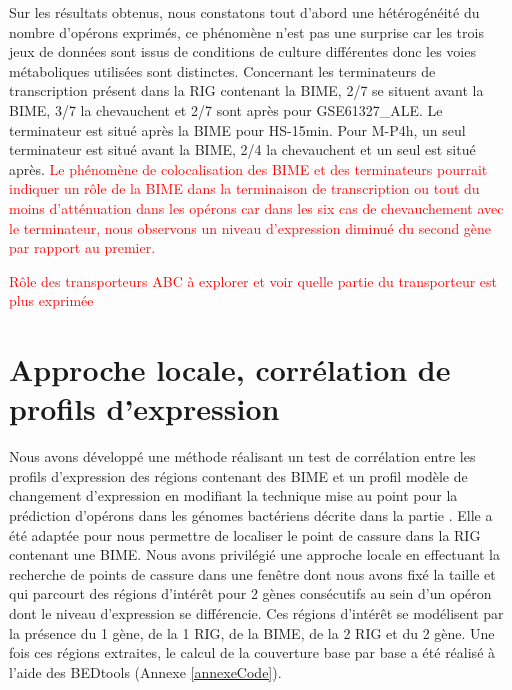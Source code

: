 \documentclass[12pt,a4paper]{report}
\begin{document}
\begin{onehalfspace}
Sur les résultats obtenus, nous constatons tout d'abord une hétérogénéité du nombre d'opérons exprimés, ce phénomène n'est pas une surprise car les trois jeux de données sont issus de conditions de culture différentes donc les voies métaboliques utilisées sont distinctes. Concernant les terminateurs de transcription présent dans la RIG contenant la BIME, 2/7 se situent avant la BIME, 3/7 la chevauchent et 2/7 sont après pour GSE61327\_ALE. Le terminateur est situé après la BIME pour HS-15min. Pour M-P4h, un seul terminateur est situé avant la BIME, 2/4 la chevauchent et un seul est situé après. \textcolor{red}{Le phénomène de colocalisation des BIME et des terminateurs pourrait indiquer un rôle de la BIME dans la terminaison de transcription ou tout du moins d'atténuation dans les opérons car dans les six cas de chevauchement avec le terminateur, nous observons un niveau d'expression diminué du second gène par rapport au premier.}

\textcolor{red}{Rôle des transporteurs ABC à explorer et voir quelle partie du transporteur est plus exprimée}

\section*{Approche locale, corrélation de profils d'expression}
\label{approche_locale}
Nous avons développé une méthode réalisant un test de corrélation entre les profils d'expression des régions contenant des BIME et un profil modèle de changement d'expression en modifiant la technique mise au point pour la prédiction d'opérons dans les génomes bactériens \citep{Fortino2014} décrite dans la partie . Elle a été adaptée pour nous permettre de localiser le point de cassure dans la RIG contenant une BIME. Nous avons privilégié une approche locale en effectuant la recherche de points de cassure dans une fenêtre dont nous avons fixé la taille et qui parcourt des régions d'intérêt pour 2 gènes consécutifs au sein d'un opéron dont le niveau d'expression se différencie. Ces régions d'intérêt se modélisent par la présence du 1 gène, de la 1 RIG, de la BIME, de la 2 RIG et du 2 gène. Une fois ces régions extraites, le calcul de la couverture base par base a été réalisé à l'aide des BEDtools (Annexe \ref{annexeCode}).


\end{onehalfspace}
\end{document}

